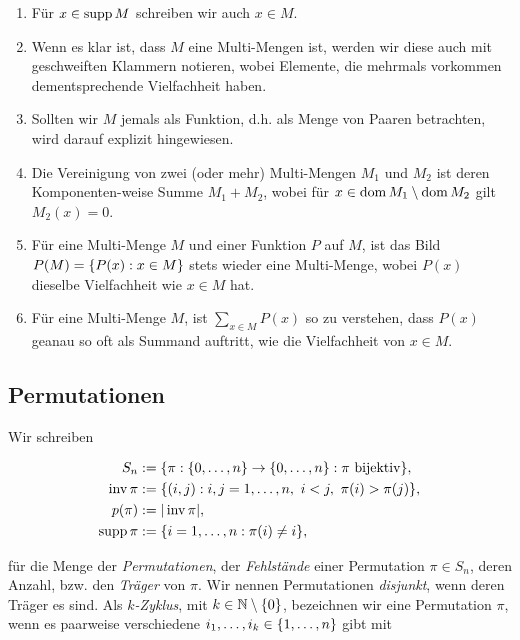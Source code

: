             \begin{enumerate}[label = \arabic*.]
                \item Für $x \in \operatorname{supp} M$ schreiben wir auch $x \in M$.
                \item Wenn es klar ist, dass $M$ eine Multi-Mengen ist, werden wir diese auch mit geschweiften Klammern notieren, wobei Elemente, die mehrmals vorkommen dementsprechende Vielfachheit haben.
                \item Sollten wir $M$ jemals als Funktion, d.h. als Menge von Paaren betrachten, wird darauf explizit hingewiesen.
                \item Die Vereinigung von zwei (oder mehr) Multi-Mengen $M_1$ und $M_2$ ist deren Komponenten-weise Summe $M_1 + M_2$, wobei für $x \in \operatorname{dom} M_1 \setminus \operatorname{dom} M_2$ gilt $M_2(x) = 0$.
                \item Für eine Multi-Menge $M$ und einer Funktion $P$ auf $M$, ist das Bild $P(M) = {\left \{ P(x): x \in M \right \}}$ stets wieder eine Multi-Menge, wobei $P(x)$ dieselbe Vielfachheit wie $x \in M$ hat.
                \item Für eine Multi-Menge $M$, ist $\sum_{x \in M} P(x)$ so zu verstehen, dass $P(x)$ geanau so oft als Summand auftritt, wie die Vielfachheit von $x \in M$.
            \end{enumerate}

        \subsection{Permutationen}

            Wir schreiben

            \begin{align*}
                S_n       & := {\left \{ \pi: {\left \{ 0, \dots, n \right \}} \to {\left \{ 0, \dots, n \right \}}: \pi ~ \text{bijektiv} \right \}}, \\
                \operatorname{inv} \pi  & := {\left \{ (i, j): i, j = 1, \dots, n, ~ i < j, ~ \pi(i) > \pi(j) \right \}}, \\
                p(\pi)    & := |\operatorname{inv} \pi|, \\
                \operatorname{supp} \pi & := {\left \{ i = 1, \dots, n: \pi(i) \neq i \right \}},
            \end{align*}

            für die Menge der \textit{Permutationen}, der \textit{Fehlstände} einer Permutation $\pi \in S_n$, deren Anzahl, bzw. den \textit{Träger} von $\pi$.
            Wir nennen Permutationen \textit{disjunkt}, wenn deren Träger es sind.
            Als \textit{$k$-Zyklus}, mit $k \in \mathbb N \setminus {\left \{ 0 \right \}}$, bezeichnen wir eine Permutation $\pi$, wenn es paarweise verschiedene $i_1, \dots, i_k \in {\left \{ 1, \dots, n \right \}}$ gibt mit

